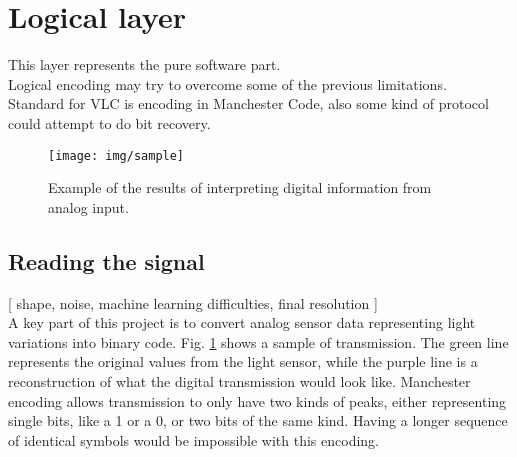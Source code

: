 
\section{Logical layer}
This layer represents the pure software part.\\
Logical encoding may try to overcome some of the previous limitations.\\
Standard for VLC is encoding in Manchester Code, also some kind of protocol could attempt to do bit recovery.

\begin{figure}[htbp] %
   \centering
   \texttt{[image: img/sample]} 
   \caption{Example of the results of interpreting digital information from analog input.}
   \label{fig:sample}
\end{figure}
 \subsection{Reading the signal}
[ shape, noise, machine learning difficulties, final resolution ]\\
A key part of this project is to convert analog sensor data representing light variations into binary code.
Fig. \ref{fig:sample} shows a sample of transmission. The green line represents the original values from the light sensor, while the purple line is a reconstruction of what the digital transmission would look like. Manchester encoding allows transmission to only have two kinds of peaks, either representing single bits, like a 1 or a 0, or two bits of the same kind.
Having a longer sequence of identical symbols would be impossible with this encoding.\\

